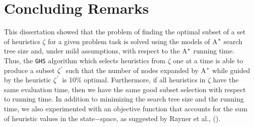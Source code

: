 
 
\chapter{Concluding Remarks}\label{ch:conclusions}

\iffalse
\chapterprecis{The purpose of this section is to introduce the meta-reasoning proposed.}\index{sinopse de capítulo}
\fi

\noindent
This dissertation showed that the problem of finding the optimal subset of a set of heuristics $\zeta$ for a given problem task is solved using the models of A$\sp{*}$ search tree size and, under mild assumptions, with respect to the A$\sp{*}$ running time. Thus, the \texttt{GHS} algorithm which selects heuristics from $\zeta$ one at a time is able to produce a subset $\zeta\sp{'}$ such that the number of nodes expanded by A$\sp{*}$ while guided by the heuristic $\zeta\sp{'}$ is 10\% optimal. Furthermore, if all heuristics in $\zeta$ have the same evaluation time, then we have the same good subset selection with respect to running time. In addition to minimizing the search tree size and the running time, we also experimented with an objective function that accounts for the sum of heuristic values in the state$-$space, as suggested by Rayner et al., (\citeyear{raynersss13}).


